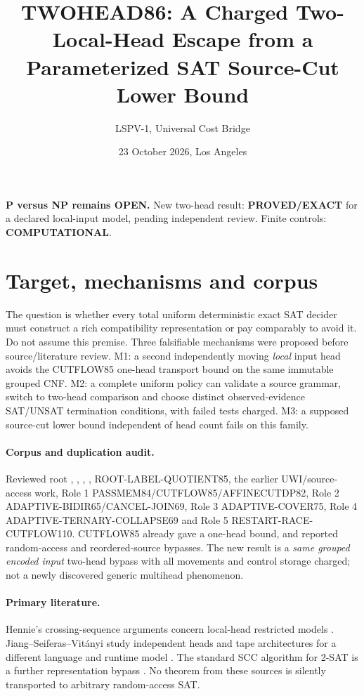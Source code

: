 \documentclass[11pt]{article}
\title{TWOHEAD86: A Charged Two-Local-Head Escape from a Parameterized SAT Source-Cut Lower Bound}
\author{LSPV-1, Universal Cost Bridge}
\date{23 October 2026, Los Angeles}
\begin{document}
\maketitle
\begin{center}\textbf{P versus NP remains OPEN.} New two-head result: \textbf{PROVED/EXACT} for a declared local-input model, pending independent review. Finite controls: \textbf{COMPUTATIONAL}.\end{center}

\section{Target, mechanisms and corpus}
The question is whether every total uniform deterministic exact SAT decider must construct a rich compatibility representation or pay comparably to avoid it. Do not assume this premise. Three falsifiable mechanisms were proposed before source/literature review. M1: a second independently moving \emph{local} input head avoids the CUTFLOW85 one-head transport bound on the same immutable grouped CNF. M2: a complete uniform policy can validate a source grammar, switch to two-head comparison and choose distinct observed-evidence SAT/UNSAT termination conditions, with failed tests charged. M3: a supposed source-cut lower bound independent of head count fails on this family.

\paragraph{Corpus and duplication audit.} Reviewed root , , , , ROOT-LABEL-QUOTIENT85, the earlier UWI/source-access work, Role 1 PASSMEM84/CUTFLOW85/AFFINECUTDP82, Role 2 ADAPTIVE-BIDIR65/CANCEL-JOIN69, Role 3 ADAPTIVE-COVER75, Role 4 ADAPTIVE-TERNARY-COLLAPSE69 and Role 5 RESTART-RACE-CUTFLOW110. CUTFLOW85 already gave a one-head bound, and reported random-access and reordered-source bypasses. The new result is a \emph{same grouped encoded input} two-head bypass with all movements and control storage charged; not a newly discovered generic multihead phenomenon.

\paragraph{Primary literature.} Hennie's crossing-sequence arguments concern local-head restricted models \cite{hennie}. Jiang--Seiferas--Vit\'anyi study independent heads and tape architectures for a different language and runtime model \cite{jiang}. The standard SCC algorithm for 2-SAT is a further representation bypass \cite{apt}. No theorem from these sources is silently transported to arbitrary random-access SAT.
\end{document}

